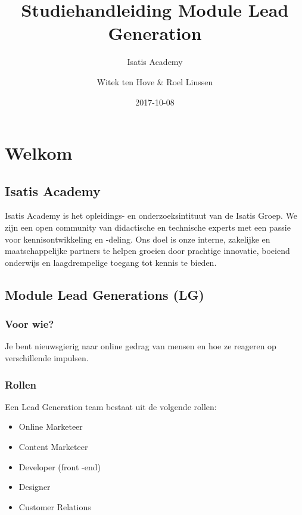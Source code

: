 \documentclass[]{book}
\title{Studiehandleiding Module Lead Generation}
\subtitle{Isatis Academy}
\author{Witek ten Hove \& Roel Linssen}
\date{2017-10-08}
\providecommand{\tightlist}{%
  \setlength{\itemsep}{0pt}\setlength{\parskip}{0pt}}
\begin{document}
\maketitle

{
\setcounter{tocdepth}{1}
\tableofcontents
}
\chapter{Welkom}\label{welkom}

\section{Isatis Academy}\label{isatis-academy}

Isatis Academy is het opleidings- en onderzoeksintituut van de Isatis
Groep. We zijn een open community van didactische en technische experts
met een passie voor kennisontwikkeling en -deling. Ons doel is onze
interne, zakelijke en maatschappelijke partners te helpen groeien door
prachtige innovatie, boeiend onderwijs en laagdrempelige toegang tot
kennis te bieden.

\section{Module Lead Generations (LG)}\label{module-lead-generations-lg}

\subsection{Voor wie?}\label{voor-wie}

Je bent nieuwsgierig naar online gedrag van mensen en hoe ze reageren op
verschillende impulsen.

\subsection{Rollen}\label{rollen}

Een Lead Generation team bestaat uit de volgende rollen:

\begin{itemize}
\tightlist
\item
  Online Marketeer
\item
  Content Marketeer
\item
  Developer (front -end)
\item
  Designer
\item
  Customer Relations
\end{itemize}
\end{document}

